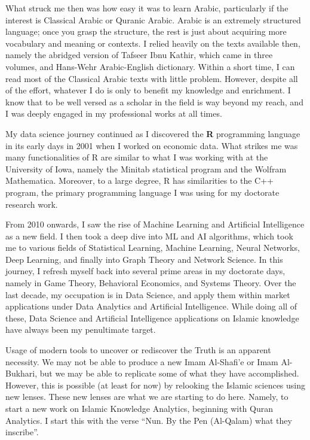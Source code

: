 \documentclass[
]{article}
\begin{document}
What struck me then was how easy it was to learn Arabic, particularly if the interest is Classical Arabic or Quranic Arabic. Arabic is an extremely structured language; once you grasp the structure, the rest is just about acquiring more vocabulary and meaning or contexts. I relied heavily on the texts available then, namely the abridged version of Tafseer Ibnu Kathir, which came in three volumes, and Hans-Wehr Arabic-English dictionary. Within a short time, I can read most of the Classical Arabic texts with little problem. However, despite all of the effort, whatever I do is only to benefit my knowledge and enrichment. I know that to be well versed as a scholar in the field is way beyond my reach, and I was deeply engaged in my professional works at all times.

My data science journey continued as I discovered the \textbf{R} programming language in its early days in 2001 when I worked on economic data. What strikes me was many functionalities of R are similar to what I was working with at the University of Iowa, namely the Minitab statistical program and the Wolfram Mathematica. Moreover, to a large degree, R has similarities to the C++ program, the primary programming language I was using for my doctorate research work.

From 2010 onwards, I saw the rise of Machine Learning and Artificial Intelligence as a new field. I then took a deep dive into ML and AI algorithms, which took me to various fields of Statistical Learning, Machine Learning, Neural Networks, Deep Learning, and finally into Graph Theory and Network Science. In this journey, I refresh myself back into several prime areas in my doctorate days, namely in Game Theory, Behavioral Economics, and Systems Theory. Over the last decade, my occupation is in Data Science, and apply them within market applications under Data Analytics and Artificial Intelligence. While doing all of these, Data Science and Artificial Intelligence applications on Islamic knowledge have always been my penultimate target.

Usage of modern tools to uncover or rediscover the Truth is an apparent necessity. We may not be able to produce a new Imam Al-Shafi'e or Imam Al-Bukhari, but we may be able to replicate some of what they have accomplished. However, this is possible (at least for now) by relooking the Islamic sciences using new lenses. These new lenses are what we are starting to do here. Namely, to start a new work on Islamic Knowledge Analytics, beginning with Quran Analytics. I start this with the verse ``Nun. By the Pen (Al-Qalam) what they inscribe''.
\end{document}
